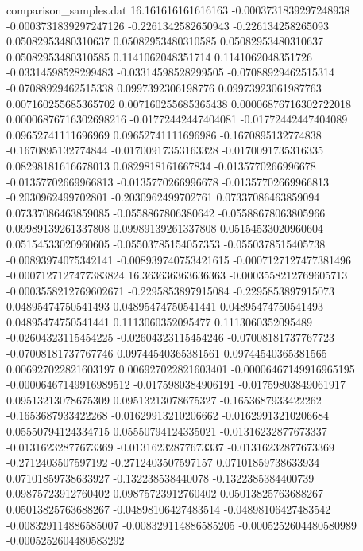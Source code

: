 \begin{filecontents}{comparison_samples.dat}
16.161616161616163  -0.0003731839297248938  -0.0003731839297247126  -0.2261342582650943    -0.226134258265093     0.05082953480310637    0.05082953480310585    0.05082953480310637    0.05082953480310585    0.1141062048351714     0.1141062048351726     -0.03314598528299483    -0.03314598528299505    -0.07088929462515314   -0.07088929462515338   0.0997392306198776      0.09973923061987763     0.007160255685365702    0.007160255685365438    0.00006876716302722018  0.00006876716302698216  -0.01772442447404081    -0.01772442447404089    0.09652741111696969     0.09652741111696986     -0.1670895132774838     -0.1670895132774844     -0.01700917353163328   -0.0170091735316335    0.08298181616678013    0.0829818161667834     -0.0135770266996678     -0.01357702669966813    -0.0135770266996678     -0.01357702669966813    -0.2030962499702801    -0.2030962499702761    0.07337086463859094     0.07337086463859085     -0.0558867806380642    -0.05588678063805966   0.09989139261337808     0.09989139261337808     0.05154533020960604     0.05154533020960605     -0.05503785154057353   -0.0550378515405738    -0.00893974075342141   -0.008939740753421615  -0.0007127127477381496  -0.0007127127477383824
16.363636363636363  -0.0003558212769605713  -0.0003558212769602671  -0.2295853897915084    -0.2295853897915073    0.04895474750541493    0.04895474750541441    0.04895474750541493    0.04895474750541441    0.1113060352095477     0.1113060352095489     -0.02604323115454225    -0.02604323115454246    -0.07008181737767723   -0.07008181737767746   0.09744540365381561     0.09744540365381565     0.006927022821603197    0.006927022821603401    -0.00006467149916965195 -0.00006467149916989512 -0.0175980384906191     -0.01759803849061917    0.09513213078675309     0.09513213078675327     -0.1653687933422262     -0.1653687933422268     -0.01629913210206662   -0.01629913210206684   0.05550794124334715    0.05550794124335021    -0.01316232877673337    -0.01316232877673369    -0.01316232877673337    -0.01316232877673369    -0.2712403507597192    -0.2712403507597157    0.07101859738633934     0.07101859738633927     -0.132238538440078     -0.1322385384400739    0.09875723912760402     0.09875723912760402     0.05013825763688267     0.05013825763688267     -0.04898106427483514   -0.04898106427483542   -0.008329114886585007  -0.008329114886585205  -0.0005252604480580989  -0.0005252604480583292

\end{filecontents}
